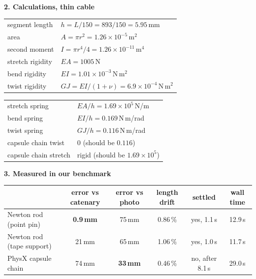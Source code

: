 \documentclass[10pt,a4paper]{article}
\newcommand{\panel}[1]{{\small\bfseries #1}}
\begin{document}
\vspace{6pt}
\panel{2. Calculations, thin cable}

\vspace{2pt}
{\small
\begin{minipage}[t]{0.50\linewidth}
\begin{tabular}{@{}l@{\quad}l@{}}
segment length & $h = L/150 = 893/150 = 5.95$\,mm \\
area & $A = \pi r^2 = 1.26\times10^{-5}$\,m$^2$ \\
second moment & $I = \pi r^4/4 = 1.26\times10^{-11}$\,m$^4$ \\
stretch rigidity & $EA = 1005$\,N \\
bend rigidity & $EI = 1.01\times10^{-3}$\,N\,m$^2$ \\
twist rigidity & $GJ = EI/(1+\nu) = 6.9\times10^{-4}$\,N\,m$^2$ \\
\end{tabular}
\end{minipage}\hfill
\begin{minipage}[t]{0.48\linewidth}
\begin{tabular}{@{}l@{\quad}l@{}}
stretch spring & $EA/h = 1.69\times10^{5}$\,N/m \\
bend spring & $EI/h = 0.169$\,N\,m/rad \\
twist spring & $GJ/h = 0.116$\,N\,m/rad \\[3pt]
capsule chain twist & $0$ \; (should be $0.116$) \\
capsule chain stretch & rigid \; (should be $1.69\times10^{5}$) \\
\end{tabular}
\end{minipage}}

\vspace{6pt}
\panel{3. Measured in our benchmark}

\vspace{1pt}
{\small
\begin{center}
\begin{tabular}{@{}l c c c c c@{}}
\toprule
 & error vs catenary & error vs photo & length drift & settled & wall time \\
\midrule
Newton rod (point pin) & \textbf{0.9\,mm} & 75\,mm & 0.86\,\% & yes, 1.1\,s & 12.9\,s \\
Newton rod (tape support) & 21\,mm & 65\,mm & 1.06\,\% & yes, 1.0\,s & 11.7\,s \\
PhysX capsule chain & 74\,mm & \textbf{33\,mm} & 0.46\,\% & no, after 8.1\,s & 29.0\,s \\
\bottomrule
\end{tabular}
\end{center}}
\end{document}
